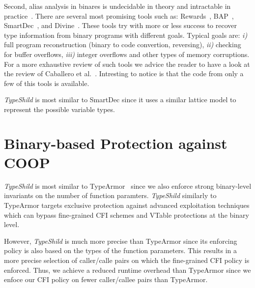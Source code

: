Second, alias analysis in binares is undecidable in theory and intractable in practice~\cite{alan:mycroft}.
There are several most promising tools such as: Rewards~\cite{lin:rewards}, BAP~\cite{bap:brumley}, 
SmartDec~\cite{fokin:smartdec}, and Divine~\cite{divine:balakrishnan}.
These tools try with more or less success to recover 
type information from binary programs with different goals.
Typical goals are: 
\textit{i)} full program reconstruction (binary to code convertion, reversing), 
\textit{ii)} checking for buffer overflows, 
\textit{iii)} integer overflows and other types of memory corruptions.
For a more exhaustive review of such tools we advice the reader to
have a look at the review of Caballero et al.~\cite{caballero:inference}.
Intresting to notice is that the code from only a few of this tools is available.

\textit{TypeShild} is most similar to SmartDec since it uses a similar lattice model to
represent the possible variable types. 

\section{Binary-based Protection against COOP}
\label{Binary-based Protection against COOP}
\textit{TypeShild} is most similar to TypeArmor~\cite{veen:typearmor} since
we also enforce strong binary-level invariants on the number of function
paramters. \textit{TypeShild} similarly to TypeArmor targets 
exclusive protection against advanced exploitation techniques 
which can bypass fine-grained CFI schemes and VTable protections at the binary level.

However, \textit{TypeShild} is much more precise than TypeArmor since its enforcing 
policy is also based on the types of the function parameters. This results in a
more precise selection of caller/calle pairs on which the fine-grained CFI policy is enforced.
Thus, we achieve a reduced runtime overhead than TypeArmor since we enfoce 
our CFI policy on fewer caller/callee pairs than TypeArmor.



